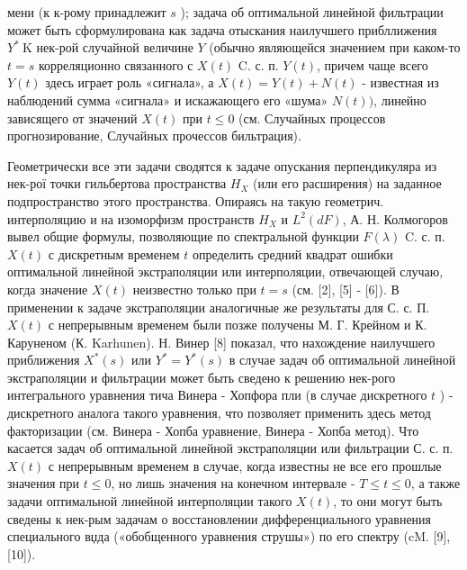 \documentclass[10pt]{article}
\begin{document}
мени (к к-рому принадлежит $s$ ); задача об оптимальной линейной фильтрации может быть сформулирована как задача отыскания наилучшего прибллижения $Y^{*} \mathrm{~K}$ нек-рой случайной величине $Y$ (обычно являющейся значением при каком-то $t=s$ корреляционно связанного с $X(t)$ C. с. п. $Y(t)$, причем чаще всего $Y(t)$ здесь играет роль «сигнала», а $X(t)=Y(t)+N(t)$ - известная из наблюдений сумма «сигнала» и искажающего его «шума» $N(t))$, линейно зависящего от значений $X(t)$ при $t \leqslant 0$ (см. Случайных процессов прогнозирование, Случайных прочессов бильтрация).



Геометрически все эти задачи сводятся к задаче опускания перпендикуляра из нек-рої точки гильбертова пространства $H_{X}$ (или его расширения) на заданное подпространство этого пространства. Опираясь на такую геометрич. интерполяцию и на изоморфизм пространств $H_{X}$ и $L^{2}(d F)$, А. Н. Колмогоров вывел общие формулы, позволяющие по спектральной функции $F(\lambda)$ C. с. п. $X(t)$ с дискретным временем $t$ определить средний квадрат ошибки оптимальной линейной экстраполяции или интерполяции, отвечающей случаю, когда значение $X(t)$ неизвестно только при $t=s$ (см. [2], [5] - [6]). В применении к задаче экстраполяции аналогичные же результаты для С. с. П. $X(t)$ с непрерывным временем были позже получены М. Г. Крейном и К. Каруненом (К. Karhunen). Н. Винер [8] показал, что нахождение наилучшего приближения $X^{*}(s)$ или $Y^{*}=Y^{*}(s)$ в случае задач об оптимальной линейной экстраполяции и фильтрации может быть сведено к решению нек-рого интегрального уравнения тича Винера - Хопфора пли (в случае дискретного $t$ ) - дискретного аналога такого уравнения, что позволяет применить здесь метод факторизации (см. Винера - Хопба уравнение, Винера - Хопба метод). Что касается задач об оптимальной линейной экстраполяции или фильтрации С. с. п. $X(t)$ с непрерывным временем в случае, когда известны не все его прошлые значения при $t \leqslant 0$, но лишь значения на конечном интервале - $T \leqslant t \leqslant 0$, а также задачи оптимальной линейной интерполяции такого $X(t)$, то они могут быть сведены к нек-рым задачам о восстановлении дифференциального уравнения специального вџда («обобщенного уравнения струшы») по его спектру (cM. [9], [10]).
\end{document}
